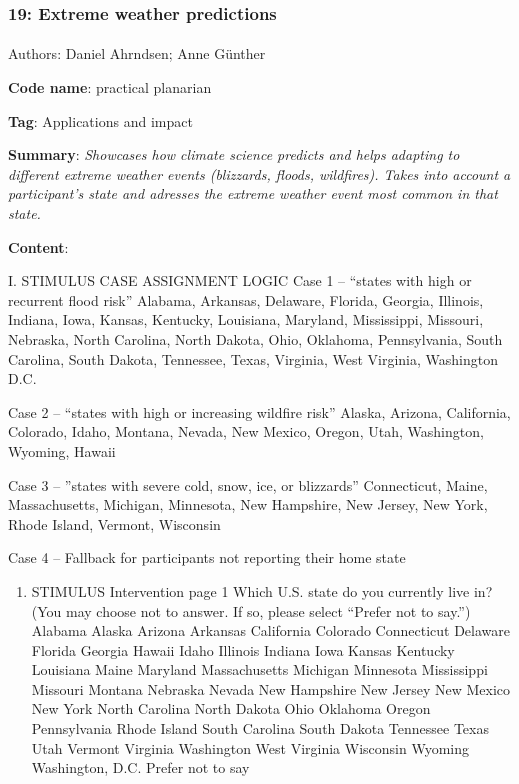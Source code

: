 \documentclass[
  letterpaper,
  DIV=11,
  numbers=noendperiod]{scrartcl}
\makeatletter
\let\oldparagraph\paragraph
\renewcommand{\paragraph}{
    \@ifstar
      \xxxParagraphStar
      \xxxParagraphNoStar
  }
\newcommand{\xxxParagraphStar}[1]{\oldparagraph*{#1}\mbox{}}
\newcommand{\xxxParagraphNoStar}[1]{\oldparagraph{#1}\mbox{}}
\providecommand{\tightlist}{%
  \setlength{\itemsep}{0pt}\setlength{\parskip}{0pt}}
\makeatother
\begin{document}
\subsubsection{19: Extreme weather
predictions}\label{extreme-weather-predictions}

\paragraph{Authors: Daniel Ahrndsen; Anne
Günther}\label{authors-daniel-ahrndsen-anne-guxfcnther}

\textbf{Code name}: practical planarian

\textbf{Tag}: Applications and impact

\textbf{Summary}: \emph{Showcases how climate science predicts and helps
adapting to different extreme weather events (blizzards, floods,
wildfires). Takes into account a participant's state and adresses the
extreme weather event most common in that state.}

\textbf{Content}:

I. STIMULUS CASE ASSIGNMENT LOGIC Case 1 -- ``states with high or
recurrent flood risk'' Alabama, Arkansas, Delaware, Florida, Georgia,
Illinois, Indiana, Iowa, Kansas, Kentucky, Louisiana, Maryland,
Mississippi, Missouri, Nebraska, North Carolina, North Dakota, Ohio,
Oklahoma, Pennsylvania, South Carolina, South Dakota, Tennessee, Texas,
Virginia, West Virginia, Washington D.C.

Case 2 -- ``states with high or increasing wildfire risk'' Alaska,
Arizona, California, Colorado, Idaho, Montana, Nevada, New Mexico,
Oregon, Utah, Washington, Wyoming, Hawaii

Case 3 -- ''states with severe cold, snow, ice, or blizzards''
Connecticut, Maine, Massachusetts, Michigan, Minnesota, New Hampshire,
New Jersey, New York, Rhode Island, Vermont, Wisconsin

Case 4 -- Fallback for participants not reporting their home state

\begin{enumerate}
\def\labelenumi{\Roman{enumi}.}
\setcounter{enumi}{1}
\tightlist
\item
  STIMULUS Intervention page 1 Which U.S. state do you currently live
  in? (You may choose not to answer. If so, please select ``Prefer not
  to say.'') Alabama Alaska Arizona Arkansas California Colorado
  Connecticut Delaware Florida Georgia Hawaii Idaho Illinois Indiana
  Iowa Kansas Kentucky Louisiana Maine Maryland Massachusetts Michigan
  Minnesota Mississippi Missouri Montana Nebraska Nevada New Hampshire
  New Jersey New Mexico New York North Carolina North Dakota Ohio
  Oklahoma Oregon Pennsylvania Rhode Island South Carolina South Dakota
  Tennessee Texas Utah Vermont Virginia Washington West Virginia
  Wisconsin Wyoming Washington, D.C. Prefer not to say
\end{enumerate}
\end{document}

